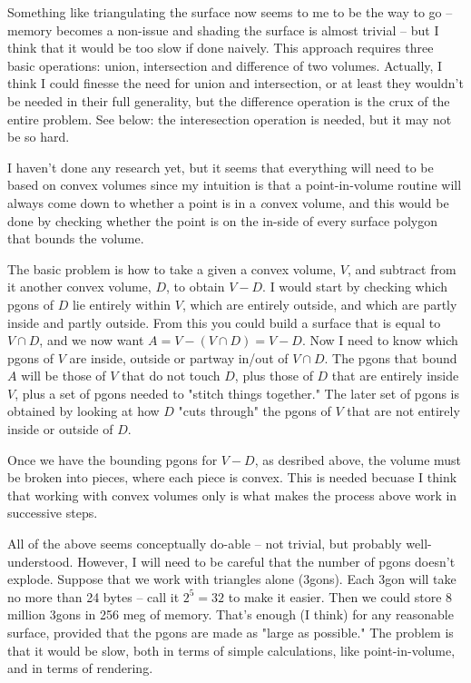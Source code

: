 \documentclass[titlepage,oneside,10pt]{article}
\begin{document}
Something like triangulating the surface now seems to me to be the way
to go -- memory becomes a non-issue and shading the surface is almost
trivial -- but I think that it would be too slow if done naively. This approach
requires three basic operations: union, intersection and difference of
two volumes. Actually, I think I could finesse the need for union and
intersection, or at least they wouldn't be needed in their full
generality, but the difference operation is the crux of the entire
problem. See below: the interesection operation is needed, but it may
not be so hard.

I haven't done any research yet, but it seems that everything will
need to be based on convex volumes since my intuition is that a
point-in-volume routine will always come down to whether a point is in
a {\emph convex} volume, and this would be done by checking whether the
point is on the in-side of every surface polygon that bounds the
volume. 

The basic problem is how to take a given a convex volume, $V$, and
subtract from it another convex volume, $D$, to obtain $V-D$. I would
start by checking which pgons of $D$ lie entirely within $V$, which are
entirely outside, and which are partly inside and partly outside. From
this you could build a surface that is equal to $V\cap D$, and we
now want $A = V - (V\cap D) = V-D$. Now I need to
know which pgons of $V$ are inside, outside or partway in/out of 
$V\cap D$. The pgons that bound $A$ will be those of $V$ that do not
touch $D$, plus those of $D$ that are entirely inside $V$, plus a set of
pgons needed to "stitch things together." The later set of pgons is
obtained by looking at how $D$ "cuts through" the pgons of $V$ that are
not entirely inside or outside of $D$.

Once we have the bounding pgons for $V-D$, as desribed above, the volume
must be broken into pieces, where each piece is convex. This is needed
becuase I think that working with convex volumes only is what makes
the process above work in successive steps.

All of the above seems conceptually do-able -- not trivial, but probably
well-understood. However, I will need to be careful that the number of
pgons doesn't explode. Suppose that we work with triangles alone
(3gons). Each 3gon will take no more than 24 bytes -- call it $2^5 = 32$
to make it easier. Then we could store 8 million 3gons in 256 meg of
memory. That's enough (I think) for any reasonable surface, provided
that the pgons are made as "large as possible." The problem is that it
would be slow, both in terms of simple calculations, like
point-in-volume, and in terms of rendering.
\end{document}
